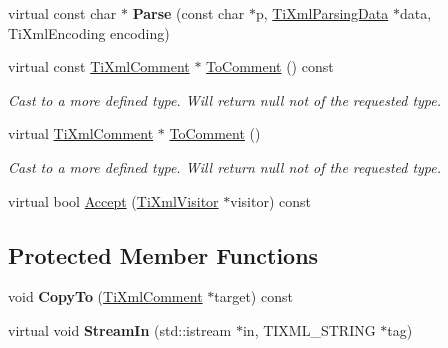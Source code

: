 \begin{DoxyCompactItemize}
\hypertarget{class_ti_xml_comment_a43bddc18ac057734b41d84653b71d3e0}{}\label{class_ti_xml_comment_a43bddc18ac057734b41d84653b71d3e0} 
virtual const char $\ast$ {\bfseries Parse} (const char $\ast$p, \hyperlink{class_ti_xml_parsing_data}{Ti\+Xml\+Parsing\+Data} $\ast$data, Ti\+Xml\+Encoding encoding)
\item 
\hypertarget{class_ti_xml_comment_a1032e176d3eb73017ceabc698cac0f16}{}\label{class_ti_xml_comment_a1032e176d3eb73017ceabc698cac0f16} 
virtual const \hyperlink{class_ti_xml_comment}{Ti\+Xml\+Comment} $\ast$ \hyperlink{class_ti_xml_comment_a1032e176d3eb73017ceabc698cac0f16}{To\+Comment} () const
\begin{DoxyCompactList}\small\item\em Cast to a more defined type. Will return null not of the requested type. \end{DoxyCompactList}\item 
\hypertarget{class_ti_xml_comment_acc7c7e07e13c23f17797d642981511df}{}\label{class_ti_xml_comment_acc7c7e07e13c23f17797d642981511df} 
virtual \hyperlink{class_ti_xml_comment}{Ti\+Xml\+Comment} $\ast$ \hyperlink{class_ti_xml_comment_acc7c7e07e13c23f17797d642981511df}{To\+Comment} ()
\begin{DoxyCompactList}\small\item\em Cast to a more defined type. Will return null not of the requested type. \end{DoxyCompactList}\item 
virtual bool \hyperlink{class_ti_xml_comment_ac894241530d1d266131a5026cb251a95}{Accept} (\hyperlink{class_ti_xml_visitor}{Ti\+Xml\+Visitor} $\ast$visitor) const
\end{DoxyCompactItemize}
\subsection*{Protected Member Functions}
\begin{DoxyCompactItemize}
\item 
\hypertarget{class_ti_xml_comment_aaeb8a0b2d503f603879a2d04ceb54295}{}\label{class_ti_xml_comment_aaeb8a0b2d503f603879a2d04ceb54295} 
void {\bfseries Copy\+To} (\hyperlink{class_ti_xml_comment}{Ti\+Xml\+Comment} $\ast$target) const
\item 
\hypertarget{class_ti_xml_comment_a619467ff29c832b101e9b704a23c0357}{}\label{class_ti_xml_comment_a619467ff29c832b101e9b704a23c0357} 
virtual void {\bfseries Stream\+In} (std\+::istream $\ast$in, T\+I\+X\+M\+L\+\_\+\+S\+T\+R\+I\+NG $\ast$tag)
\end{DoxyCompactItemize}
